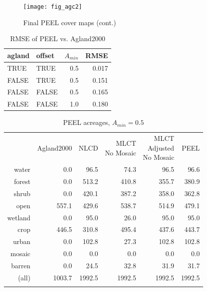 \begin{figure}[ht] 
  \centering


\texttt{[image: fig\_agc2]}
\caption{Final PEEL cover maps (cont.)} 
\label{fig:agc2} 
\end{figure} 




\begin{table}[ht]
\begin{center}
\begin{tabular}{llrr}
  \hline
agland & offset & $A_{min}$ & RMSE \\ 
  \hline
TRUE & TRUE & 0.5 & 0.017 \\ 
  FALSE & TRUE & 0.5 & 0.151 \\ 
  FALSE & FALSE & 0.5 & 0.165 \\ 
  FALSE & FALSE & 1.0 & 0.180 \\ 
   \hline
\end{tabular}
\caption{RMSE of PEEL vs. Agland2000}
\label{tab:rmse3}
\end{center}
\end{table}
\begin{table}[ht]
\begin{center}
{\small
\begin{tabular}{rrrrrr}
  \hline
 & Agland2000 & NLCD & \pbox[c][][c]{3in}{MLCT\\No Mosaic} & \pbox[c][][c]{3in}{\smallskip{}MLCT\\Adjusted\\No Mosaic} & PEEL \\ 
  \noalign{\smallskip} \hline
water & 0.0 & 96.5 & 74.3 & 96.5 & 96.6 \\ 
  forest & 0.0 & 513.2 & 410.8 & 355.7 & 380.9 \\ 
  shrub & 0.0 & 420.1 & 387.2 & 358.0 & 362.8 \\ 
  open & 557.1 & 429.6 & 538.7 & 514.9 & 479.1 \\ 
  wetland & 0.0 & 95.0 & 26.0 & 95.0 & 95.0 \\ 
  crop & 446.5 & 310.8 & 495.4 & 437.6 & 443.7 \\ 
  urban & 0.0 & 102.8 & 27.3 & 102.8 & 102.8 \\ 
  mosaic & 0.0 & 0.0 & 0.0 & 0.0 & 0.0 \\ 
  barren & 0.0 & 24.5 & 32.8 & 31.9 & 31.7 \\ 
  (all) & 1003.7 & 1992.5 & 1992.5 & 1992.5 & 1992.5 \\ 
   \noalign{\smallskip} \hline
\end{tabular}
}
\caption{PEEL acreages, $A_{min}=0.5$}
\label{tab:areas3}
\end{center}
\end{table}
 

